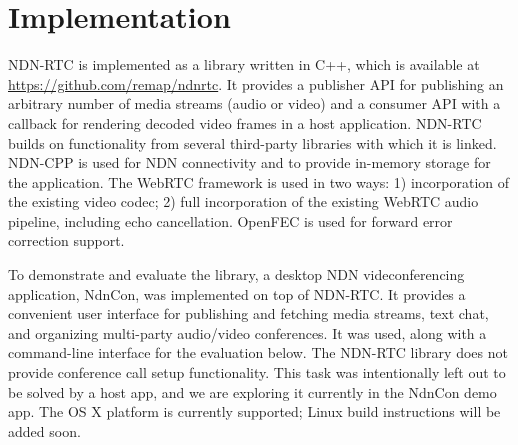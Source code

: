 \documentclass{icn/sig-alternate-2013} %
\newcommand{\ndnrtcName}{NDN-RTC} %
\newcommand{\ndnconName}{NdnCon}
\begin{document}
\section{Implementation}
\label{sec:imp}
\ndnrtcName{} is implemented as a library written in C++, which is available at \url{https://github.com/remap/ndnrtc}. 
It provides a publisher API for publishing an arbitrary number of media streams (audio or video) and a consumer API with a callback for rendering decoded video frames in a host application. \ndnrtcName{} builds on functionality from several third-party libraries with which it is linked. NDN-CPP \cite{ndnccl} is used for NDN connectivity and to provide in-memory storage for the application. The WebRTC framework \cite{webrtc} is used in two ways: 1) incorporation of the existing video codec; 2) full incorporation of the existing WebRTC audio pipeline, including echo cancellation. OpenFEC \cite{openfec} is used for forward error correction support. 


To demonstrate and evaluate the library, a desktop NDN videconferencing application, \ndnconName{}, \cite{ndncon} was implemented on top of \ndnrtcName{}. It provides a convenient user interface for publishing and fetching media streams, text chat, and organizing multi-party audio/video conferences. It was used, along with a command-line interface for the evaluation below.
The \ndnrtcName{} library does not provide conference call setup functionality. This task was intentionally left out to be solved by a host app, and we are exploring it currently in the \ndnconName{} demo app.  The OS X platform is currently supported; Linux build instructions will be added soon. %
\end{document}
